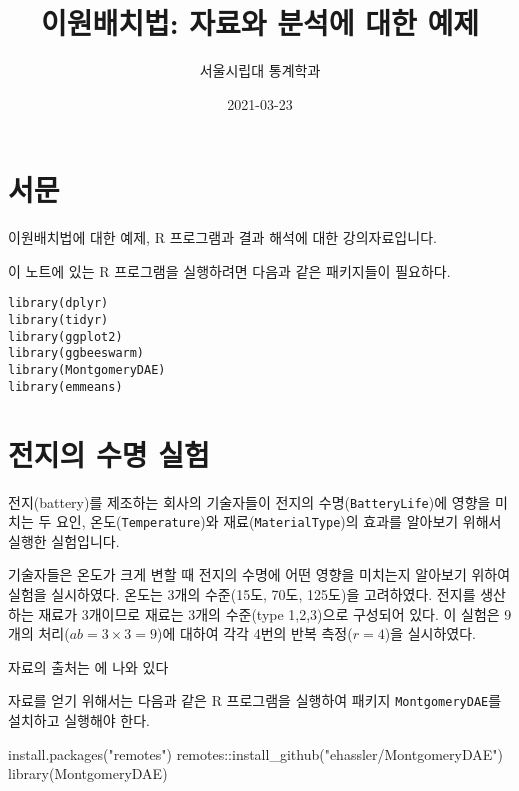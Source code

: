 \documentclass[
]{book}
\title{이원배치법: 자료와 분석에 대한 예제}
\author{서울시립대 통계학과}
\date{2021-03-23}
\newenvironment{Shaded}{\begin{snugshade}}{\end{snugshade}}
\newcommand{\FunctionTok}[1]{\textcolor[rgb]{0.00,0.00,0.00}{#1}}
\newcommand{\NormalTok}[1]{#1}
\newcommand{\SpecialCharTok}[1]{\textcolor[rgb]{0.00,0.00,0.00}{#1}}
\newcommand{\StringTok}[1]{\textcolor[rgb]{0.31,0.60,0.02}{#1}}
\begin{document}
\maketitle

{
\setcounter{tocdepth}{1}
\tableofcontents
}
\hypertarget{uxc11cuxbb38}{%
\chapter*{서문}\label{uxc11cuxbb38}}


이원배치법에 대한 예제, R 프로그램과 결과 해석에 대한 강의자료입니다.

이 노트에 있는 R 프로그램을 실행하려면 다음과 같은 패키지들이 필요하다.

\begin{verbatim}
library(dplyr)
library(tidyr)
library(ggplot2)
library(ggbeeswarm)
library(MontgomeryDAE)
library(emmeans)
\end{verbatim}

\mainmatter

\hypertarget{battery}{%
\chapter{전지의 수명 실험}\label{battery}}

전지(battery)를 제조하는 회사의 기술자들이 전지의 수명(\texttt{BatteryLife})에 영향을 미치는 두 요인, 온도(\texttt{Temperature})와 재료(\texttt{MaterialType})의 효과를 알아보기 위해서 실행한 실험입니다.

기술자들은 온도가 크게 변할 때 전지의 수명에 어떤 영향을 미치는지 알아보기 위하여 실험을 실시하였다. 온도는 3개의 수준(15도, 70도, 125도)을 고려하였다. 전지를 생산하는 재료가 3개이므로 재료는 3개의 수준(type 1,2,3)으로 구성되어 있다. 이 실험은 9 개의 처리(\(ab=3\times 3=9\))에 대하여 각각 4번의 반복 측정(\(r=4\))을 실시하였다.

자료의 출처는 \citep{montgomery2017design} 에 나와 있다

자료를 얻기 위해서는 다음과 같은 R 프로그램을 실행하여 패키지 \texttt{MontgomeryDAE}를 설치하고 실행해야 한다.

\begin{Shaded}
\begin{Highlighting}[]
\FunctionTok{install.packages}\NormalTok{(}\StringTok{"remotes"}\NormalTok{)}
\NormalTok{remotes}\SpecialCharTok{::}\FunctionTok{install\_github}\NormalTok{(}\StringTok{"ehassler/MontgomeryDAE"}\NormalTok{)}
\FunctionTok{library}\NormalTok{(MontgomeryDAE)}
\end{Highlighting}
\end{Shaded}
\end{document}
